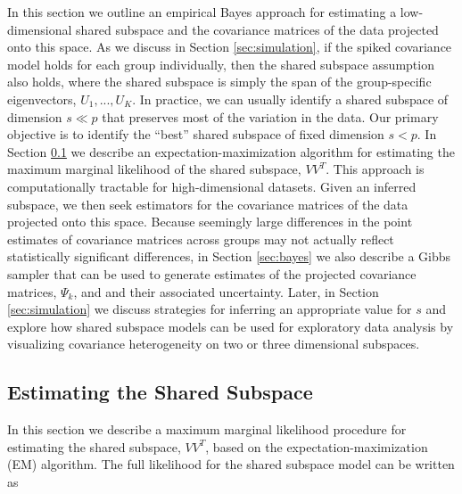 \documentclass[12pt]{article}
\begin{document}
In this section we outline an empirical Bayes approach for estimating
a low-dimensional shared subspace and the covariance matrices of the
data projected onto this space. As we discuss in Section
\ref{sec:simulation}, if the spiked covariance model holds for each
group individually, then the shared subspace assumption also holds,
where the shared subspace is simply the span of the group-specific
eigenvectors, $U_1, ..., U_K$. In practice, we can usually identify a
shared subspace of dimension $s \ll p$ that preserves most of the
variation in the data.  Our primary objective is to identify the
``best'' shared subspace of fixed dimension $s < p$.  In Section
\ref{sec:em} we describe an expectation-maximization algorithm for
estimating the maximum marginal likelihood of the shared subspace,
$VV^T$.  This approach is computationally tractable for
high-dimensional datasets.  Given an inferred subspace, we then seek
estimators for the covariance matrices of the data projected onto this
space.  Because seemingly large differences in the point estimates of
covariance matrices across groups may not actually reflect
statistically significant differences, in Section \ref{sec:bayes} we
also describe a Gibbs sampler that can be used to generate estimates
of the projected covariance matrices, $\Psi_k$, and and their
associated uncertainty.  Later, in Section \ref{sec:simulation} we
discuss strategies for inferring an appropriate value for $s$ and
explore how shared subspace models can be used for exploratory data
analysis by visualizing covariance heterogeneity on two or three
dimensional subspaces.





\subsection{Estimating the  Shared Subspace}
\label{sec:em}

In this section we describe a maximum marginal likelihood procedure for
estimating the shared subspace, $VV^T$, based on the
expectation-maximization (EM) algorithm.  The full likelihood
for the shared subspace model can be written as
\end{document}
